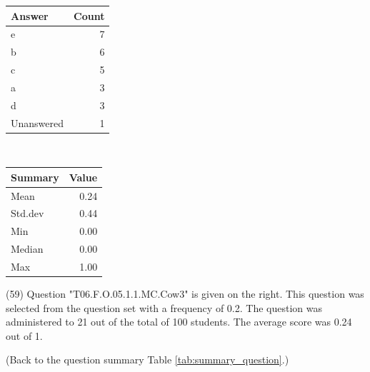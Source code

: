 \documentclass[12pt,nohyper]{tufte-handout}\usepackage[]{graphicx}\usepackage[]{color}
\begin{document}
\begin{center}%
\begin{tabular}{lr}
  \hline
Answer & Count \\ 
  \hline
e &   7 \\ 
  b &   6 \\ 
  c &   5 \\ 
  a &   3 \\ 
  d &   3 \\ 
  Unanswered &   1 \\ 
   \hline
\end{tabular}
~~~~~~~~%
\begin{tabular}{lr}
  \hline
Summary & Value \\ 
  \hline
Mean & 0.24 \\ 
  Std.dev & 0.44 \\ 
  Min & 0.00 \\ 
  Median & 0.00 \\ 
  Max & 1.00 \\ 
   \hline
\end{tabular}
\end{center}\newpage{} (59) Question "T06.F.O.05.1.1.MC.Cow3" is given on the right. This question was selected from the question set with a frequency of 0.2. The question was administered to 21 out of the total of 100 students. The average score was 0.24 out of 1.

 (Back to the question summary Table \ref{tab:summary_question}.)
\end{document}

